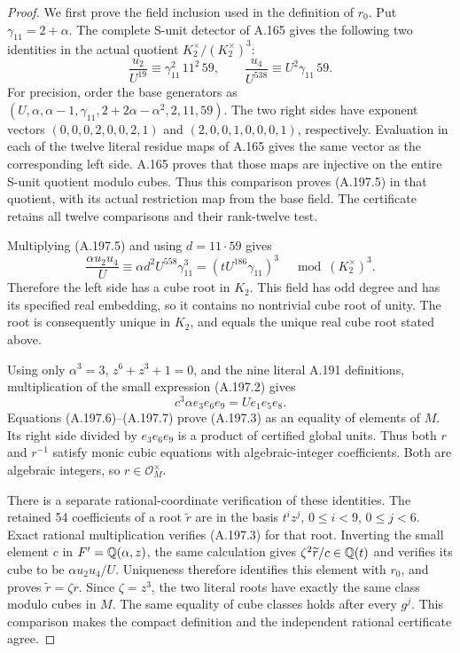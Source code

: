 \begin{proof}
We first prove the field inclusion used in the definition of
\(r_0\).  Put \(\gamma_{11}=2+\alpha\).  The complete
S-unit detector of A.165 gives the following two identities
in the actual quotient \(K_2^\times/(K_2^\times)^3\):
\[
 \frac{u_2}{U^{19}}\equiv\gamma_{11}^2\,11^2\,59,
 \qquad
 \frac{u_4}{U^{538}}\equiv U^2\gamma_{11}\,59.
\tag{A.197.5}
\]
For precision, order the base generators as
\((U,\alpha,\alpha-1,\gamma_{11},
2+2\alpha-\alpha^2,2,11,59)\).
The two right sides have exponent vectors
\((0,0,0,2,0,0,2,1)\) and
\((2,0,0,1,0,0,0,1)\), respectively.
Evaluation in each of the twelve literal residue maps of
A.165 gives the same vector as the corresponding left side.
A.165 proves that those maps are injective on the entire
S-unit quotient modulo cubes.  Thus this comparison proves
(A.197.5) in that quotient, with its actual restriction map
from the base field.  The certificate
retains all twelve comparisons and their rank-twelve test.

Multiplying (A.197.5) and using \(d=11\cdot59\) gives
\[
 \frac{\alpha u_2u_4}{U}
       \equiv\alpha d^2U^{558}\gamma_{11}^3
       =(tU^{186}\gamma_{11})^3
            \quad\bmod (K_2^\times)^3.
\tag{A.197.6}
\]
Therefore the left side has a cube root in \(K_2\).
This field has odd degree and has its specified real
embedding, so it contains no nontrivial cube root of unity.
The root is consequently unique in \(K_2\), and equals
the unique real cube root stated above.

Using only \(\alpha^3=3\), \(z^6+z^3+1=0\), and the
nine literal A.191 definitions, multiplication of the small
expression (A.197.2) gives
\[
          c^3\alpha e_3e_6e_9=Ue_1e_5e_8.
\tag{A.197.7}
\]
Equations (A.197.6)--(A.197.7) prove (A.197.3) as an
equality of elements of \(M\).  Its right side divided
by \(e_3e_6e_9\) is a product of certified global units.
Thus both \(r\) and \(r^{-1}\) satisfy monic cubic
equations with algebraic-integer coefficients.  Both are
algebraic integers, so \(r\in\mathcal O_M^\times\).

There is a separate rational-coordinate verification of
these identities.  The retained 54 coefficients of a root
\(\widetilde r\) are in the basis
\(t^iz^j\), \(0\leq i<9\), \(0\leq j<6\).
Exact rational multiplication verifies (A.197.3) for that
root.  Inverting the small element \(c\) in
\(F'=\mathbb Q(\alpha,z)\), the same calculation gives
\(\zeta^2\widetilde r/c\in\mathbb Q(t)\) and verifies its
cube to be \(\alpha u_2u_4/U\).  Uniqueness therefore
identifies this element with \(r_0\), and proves
\(\widetilde r=\zeta r\).  Since \(\zeta=z^3\),
the two literal roots have exactly the same class modulo
cubes in \(M\).  The same equality of cube classes holds
after every \(g^j\).  This comparison makes the compact
definition and the independent rational certificate agree.


\end{proof}

